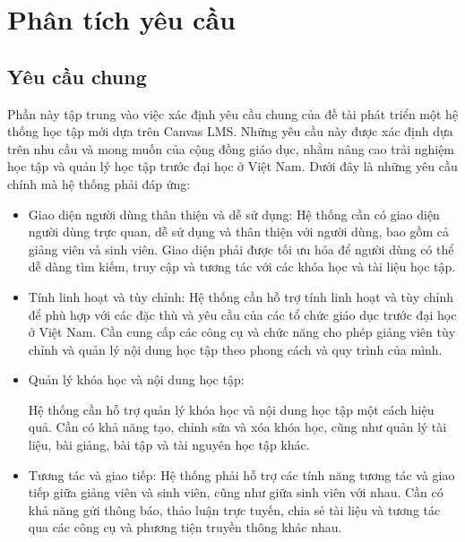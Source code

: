 \documentclass[../Thesis.tex]{subfiles}
\begin{document}
\section{Phân tích yêu cầu}
    \subsection{Yêu cầu chung}
        Phần này tập trung vào việc xác định yêu cầu chung của đề tài phát triển một hệ thống học tập mới dựa trên Canvas LMS. Những yêu cầu này được xác định dựa trên nhu cầu và mong muốn của cộng đồng giáo dục, nhằm nâng cao trải nghiệm học tập và quản lý học tập trước đại học ở Việt Nam. Dưới đây là những yêu cầu chính mà hệ thống phải đáp ứng:

        \begin{itemize}[label=$\bullet$]
        
            \item Giao diện người dùng thân thiện và dễ sử dụng:
            Hệ thống cần có giao diện người dùng trực quan, dễ sử dụng và thân thiện với người dùng, bao gồm cả giảng viên và sinh viên.
            Giao diện phải được tối ưu hóa để người dùng có thể dễ dàng tìm kiếm, truy cập và tương tác với các khóa học và tài liệu học tập.
            
            \item Tính linh hoạt và tùy chỉnh:
            Hệ thống cần hỗ trợ tính linh hoạt và tùy chỉnh để phù hợp với các đặc thù và yêu cầu của các tổ chức giáo dục trước đại học ở Việt Nam.
            Cần cung cấp các công cụ và chức năng cho phép giảng viên tùy chỉnh và quản lý nội dung học tập theo phong cách và quy trình của mình.
            
            \item Quản lý khóa học và nội dung học tập:
            
            Hệ thống cần hỗ trợ quản lý khóa học và nội dung học tập một cách hiệu quả.
            Cần có khả năng tạo, chỉnh sửa và xóa khóa học, cũng như quản lý tài liệu, bài giảng, bài tập và tài nguyên học tập khác.
            
            \item Tương tác và giao tiếp:
            Hệ thống phải hỗ trợ các tính năng tương tác và giao tiếp giữa giảng viên và sinh viên, cũng như giữa sinh viên với nhau.
            Cần có khả năng gửi thông báo, thảo luận trực tuyến, chia sẻ tài liệu và tương tác qua các công cụ và phương tiện truyền thông khác nhau.
            

\end{itemize}
\end{document}
